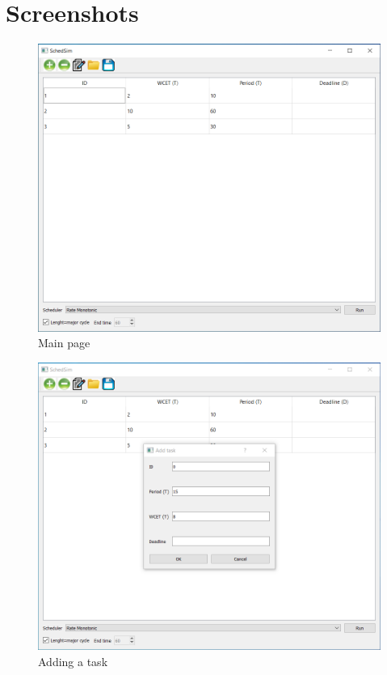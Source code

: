 \section{Screenshots}

\begin{figure}
\centering
\includegraphics[width=1\textwidth]{main.png}
\caption{\label{fig:frog}Main page}
\end{figure}

\begin{figure}
\centering
\includegraphics[width=1\textwidth]{add.png}
\caption{\label{fig:frog}Adding a task}
\end{figure}

